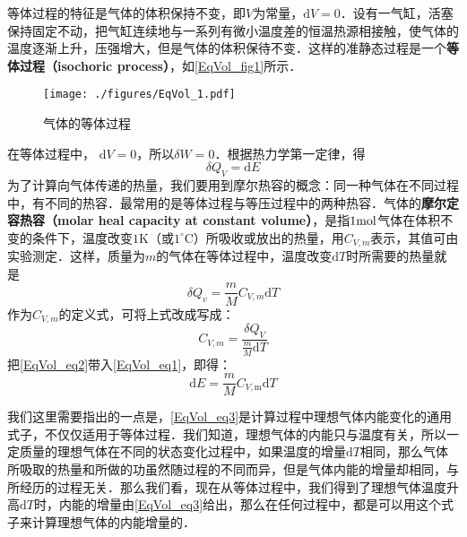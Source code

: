 

等体过程的特征是气体的体积保持不变，即$V $为常量，$\mathrm dV=0$．设有一气缸，活塞保持固定不动，把气缸连续地与一系列有微小温度差的恒温热源相接触，使气体的温度逐渐上升，压强增大，但是气体的体积保待不变．这样的准静态过程是一个\textbf{等体过程（isochoric process）}，如\autoref{EqVol_fig1}所示．
\begin{figure}[ht]
\centering
\texttt{[image: ./figures/EqVol\_1.pdf]}
\caption{气体的等体过程} \label{EqVol_fig1}
\end{figure}
在等体过程中， $\mathrm dV=0$，所以$\delta W=0$．根据热力学第一定律，得
\begin{equation} \label{EqVol_eq1}
\delta Q_{V}=\mathrm{d} E
\end{equation}
为了计算向气体传递的热量，我们要用到摩尔热容的概念：同一种气体在不同过程中，有不同的热容．最常用的是等体过程与等压过程中的两种热容．气体的\textbf{摩尔定容热容（molar heal capacity at constant volume）}，是指$1 \rm mol$气体在体积不变的条件下，温度改变$1\mathrm{K}$（或$1^\circ \mathrm{C}$）所吸收或放出的热量，用$C_{V,m}$表示，其值可由实验测定．这样，质量为$m $的气体在等体过程中，温度改变$\mathrm dT $时所需要的热量就是
\begin{equation} \label{EqVol_eq2}
\delta Q_{v}=\frac{m}{M} C_{V, {m}} \mathrm{d} T
\end{equation}
作为$C_{V,m}$的定义式，可将上式改成写成：
\begin{equation} 
C_{V, m}=\frac{\delta Q_{V}}{\frac{m}{M} \mathrm{d} T}
\end{equation}
把\autoref{EqVol_eq2}带入\autoref{EqVol_eq1}，即得：
\begin{equation} \label{EqVol_eq3}
\mathrm{d} E=\frac{m}{M} C_{V, \mathrm{m}} \mathrm{d} T
\end{equation}

我们这里需要指出的一点是，\autoref{EqVol_eq3}是计算过程中理想气体内能变化的通用式子，不仅仅适用于等体过程．我们知道，理想气体的内能只与温度有关，所以一定质量的理想气体在不同的状态变化过程中，如果温度的增量$\mathrm dT $相同，那么气体所吸取的热量和所做的功虽然随过程的不同而异，但是气体内能的增量却相同，与所经历的过程无关．那么我们看，现在从等体过程中，我们得到了理想气体温度升高$\mathrm dT $时，内能的增量由\autoref{EqVol_eq3}给出，那么在任何过程中，都是可以用这个式子来计算理想气体的内能增量的．